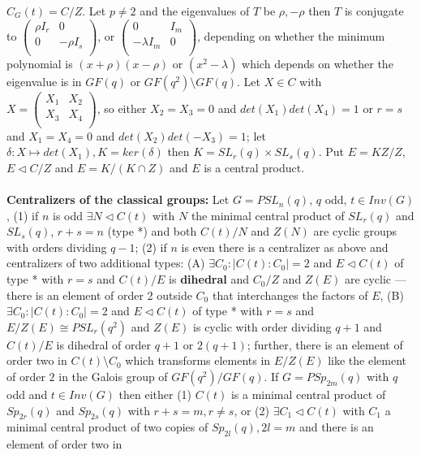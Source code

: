 $C_G(t)= C/Z$.  Let $p \ne 2$ and the eigenvalues of $T$ be $\rho, -\rho$ then $T$
is conjugate to
$\left(
\begin{array}{cc}
\rho I_r & 0 \\
0 & - \rho I_s \\
\end{array}
\right)$,
or
$\left(
\begin{array}{cc}
0 & I_m \\
- \lambda I_m & 0 \\
\end{array}
\right)$,
depending on whether the minimum polynomial is $(x+ \rho)(x- \rho)$ or $(x^2- \lambda)$
which depends on whether the eigenvalue is in $GF(q)$ or $GF(q^2) \setminus GF(q)$.
Let $X \in C$ with 
$X=
\left(
\begin{array}{cc}
X_1 & X_2 \\
X_3 & X_4 \\
\end{array}
\right)$, so either 
$X_2=X_3=0$ and $det(X_1) det(X_4)=1$ or
$r=s$ and
$X_1=X_4=0$ and $det(X_2) det(-X_3)=1$; let $\delta: X \mapsto det(X_1), K= ker(\delta)$
then $K= SL_r(q) \times SL_s(q)$.  Put $E=KZ/Z$, $E \lhd C/Z$ and $E= K/(K \cap Z)$ and
$E$ is a central product.\\
\\
{\bf Centralizers of the classical groups:}
Let $G= PSL_n(q)$, $q$ odd, $t \in Inv(G)$,  
(1) if $n$ is odd $\exists N \lhd C(t)$ with
$N$ the minimal central product of $SL_r(q)$ and $SL_s(q)$, $r+s=n$ (type *) and both
$C(t)/N$ and $Z(N)$ are cyclic groups with orders dividing $q-1$;
(2) if $n$ is even there is a centralizer as above and centralizers of two additional
types: 
(A) $\exists C_0 : |C(t):C_0|=2$ and $E \lhd C(t)$ of type * with $r=s$ and
$C(t)/E$ is {\bf dihedral} and $C_0/Z$ and $Z(E)$ are cyclic --- there is an element of
order 2 outside $C_0$ that interchanges the factors of $E$,
(B) $\exists C_0 : |C(t):C_0|=2$ and $E \lhd C(t)$ of type * with $r=s$ and
$E/Z(E) \cong PSL_r(q^2)$ and $Z(E)$ is cyclic with order dividing $q+1$ and
$C(t)/E$ is dihedral of order $q+1$ or $2(q+1)$; further, there is an element of order
two in $C(t) \setminus C_0$ which transforms elements in $E/Z(E)$ like the element
of order $2$ in the Galois group of $GF(q^2)/GF(q)$.
If $G= PSp_{2m}(q)$ with $q$ odd and $t \in Inv(G)$ then either
(1) $C(t)$ is a minimal central product of 
$Sp_{2r}(q)$ and
$Sp_{2s}(q)$ with $r+s=m, r \ne s$, or
(2) $\exists C_1 \lhd C(t)$ with $C_1$ a minimal central product of two copies
of $Sp_{2l}(q), 2l=m$ and there is an element of order two in
